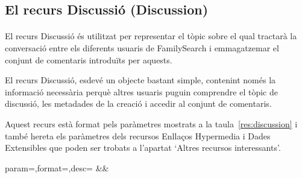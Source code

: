 \subsection{El recurs Discussió (Discussion)}

    \paragraph{}
    El recurs Discussió és utilitzat per representar el tòpic sobre el qual tractarà la conversació entre els diferents usuaris de FamilySearch i emmagatzemar el conjunt de comentaris introduïts per aquests.

    El recurs Discussió, esdevé un objecte bastant simple, contenint només la informació necessària perquè altres usuaris puguin comprendre el tòpic de discussió, les metadades de la creació i accedir al conjunt de comentaris.

    Aquest recurs està format pels paràmetres mostrats a la taula~\ref{res:discussion} i també hereta els paràmetres dels recursos Enllaços Hypermedia i Dades Extensibles que poden ser trobats a l'apartat `Altres recursos interessants'.

    \clearpage

    \begin{center}
             {param=\param,format=\format,desc=\desc}
             {\param&\format&\desc}
     \end{center}
